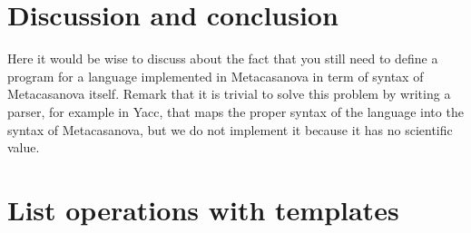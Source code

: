 \documentclass[8pt,a5paper]{extbook}
\theoremstyle{definition}
\begin{document}
\chapter{Discussion and conclusion}
\label{ch:discussion}
Here it would be wise to discuss about the fact that you still need to define a program for a language implemented in Metacasanova in term of syntax of Metacasanova itself. Remark that it is trivial to solve this problem by writing a parser, for example in Yacc, that maps the proper syntax of the language into the syntax of Metacasanova, but we do not implement it because it has no scientific value.

\appendix
\chapter{List operations with templates}
\label{app:template}


\backmatter



\end{document}
